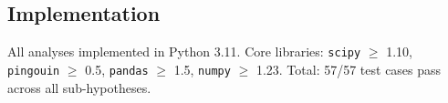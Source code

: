 \subsection{Implementation}

All analyses implemented in Python 3.11. Core libraries: \texttt{scipy} $\geq$ 1.10, \texttt{pingouin} $\geq$ 0.5, \texttt{pandas} $\geq$ 1.5, \texttt{numpy} $\geq$ 1.23. Total: 57/57 test cases pass across all sub-hypotheses.
